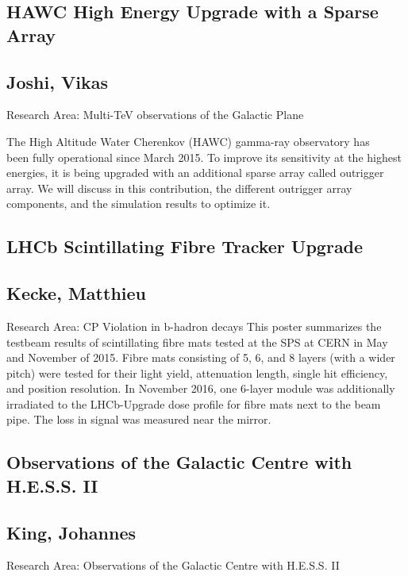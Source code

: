 \subsection*{\centering \large HAWC High Energy Upgrade with a Sparse Array}
\subsection*{\centering \normalsize Joshi, Vikas}
Research Area: Multi-TeV observations of the Galactic Plane\newline

\noindent The High Altitude Water Cherenkov (HAWC) gamma-ray observatory has\\been fully operational since March 2015. To improve its sensitivity at the highest energies, it is being upgraded with an additional sparse array called outrigger array. We will discuss in this contribution, the different outrigger array components, and the simulation results to optimize it.

\newpage

\subsection*{\centering \large LHCb Scintillating Fibre Tracker Upgrade}
\subsection*{\centering \normalsize Kecke, Matthieu}
Research Area: CP Violation in b-hadron decays\newline
\noindent This poster summarizes the testbeam results of scintillating fibre mats tested at the SPS at CERN in May and November of 2015. Fibre mats consisting of 5, 6, and 8 layers (with a wider pitch) were tested for their light yield, attenuation length, single hit efficiency, and position resolution. In November 2016, one 6-layer module was additionally irradiated to the LHCb-Upgrade dose profile for fibre mats next to the beam pipe. The loss in signal was measured near the mirror.

\subsection*{\centering \large Observations of the Galactic Centre with H.E.S.S. II}
\subsection*{\centering \normalsize King, Johannes}
Research Area: Observations of the Galactic Centre with H.E.S.S. II\newline

